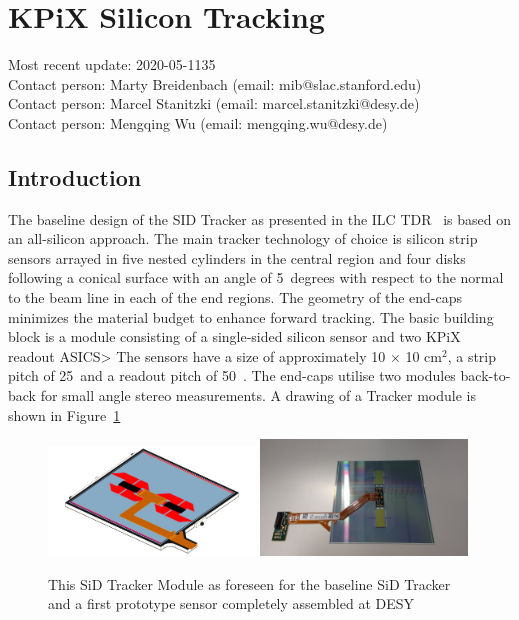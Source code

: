 \section{KPiX Silicon Tracking}
Most recent update: 2020-05-1135 \\
Contact person: Marty Breidenbach (email: mib@slac.stanford.edu)\\
Contact person: Marcel Stanitzki (email: marcel.stanitzki@desy.de)\\
Contact person: Mengqing Wu (email: mengqing.wu@desy.de)\\


\newcommand{\LYCORIS}{{\textsc{Lycoris}}\xspace}
\newcommand{\DESYII}{{\mbox{DESY II}}\xspace}
\newcommand{\DIITBF}{{\DESYII Test Beam Facility}\xspace}


\subsection{Introduction}
The baseline design of the SID Tracker as presented in the ILC TDR~\cite{Behnke:2013lya} is based on an all-silicon approach.
The main tracker technology of choice is silicon strip sensors arrayed in five nested cylinders in the central
region and four disks following a conical surface with an angle of 5~degrees with respect to the normal to the 
beam line in each of the end regions. The geometry of the end-caps minimizes the material budget to enhance 
forward tracking. The basic building block is a module consisting of a single-sided silicon sensor and two KPiX readout ASICS>
The sensors have a size of  approximately 10 $\times$ 10 cm$^2$, a strip pitch of 25~\micron and a readout pitch of 50~\micron. 
The end-caps utilise two modules back-to-back for small angle stereo measurements. 
A drawing of a Tracker module is shown in Figure~\ref{fig:SiliconTrackin:KPiX:module}
\begin{figure}
\includegraphics[width=0.49\textwidth]{Tracker/KPIX/Tracker_Module_SiD_Drawing.png}
\includegraphics[width=0.49\textwidth]{Tracker/KPIX/Tracker_Module_SiD_Photo.jpg}
\caption{This SiD Tracker Module as foreseen for the baseline SiD Tracker\cite{Behnke:2013lya} and a first prototype sensor completely assembled at DESY}
\label{fig:SiliconTrackin:KPiX:module}
\end{figure}

